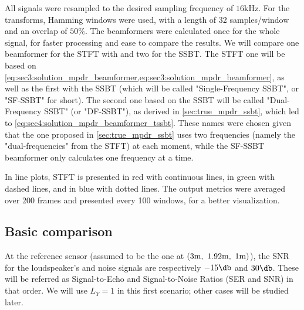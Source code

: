 All signals were resampled to the desired sampling frequency of $16\si{\kilo\hertz}$. For the transforms, Hamming windows were used, with a length of 32 samples/window and an overlap of $50\%$. The beamformers were calculated once for the whole signal, for faster processing and ease to compare the results. We will compare one beamformer for the STFT with and two for the SSBT. The STFT one will be based on \cref{eq:sec3:solution_mpdr_beamformer,eq:sec3:solution_mpdr_beamformer}, as well as the first with the SSBT (which will be called "Single-Frequency SSBT", or "SF-SSBT" for short). The second one based on the SSBT will be called "Dual-Frequency SSBT" (or "DF-SSBT"), as derived in \cref{sec:true_mpdr_ssbt}, which led to \cref{eq:sec4:solution_mpdr_beamformer_tssbt}. These names were chosen given that the one proposed in \cref{sec:true_mpdr_ssbt} uses two frequencies (namely the "dual-frequencies" from the STFT) at each moment, while the SF-SSBT beamformer only calculates one frequency at a time.

In line plots, STFT is presented in red with continuous lines, \nssbt{} in green with dashed lines, and \tssbt{} in blue with dotted lines. The output metrics were averaged over 200 frames and presented every 100 windows, for a better visualization.
%

\subsection{Basic comparison}
At the reference sensor (assumed to be the one at $(3\si{\meter},~1.92\si{\meter},~1\si{\meter})$), the SNR for the loudspeaker's and noise signals are respectively $-15\dB$ and $30\dB$. These will be referred as Signal-to-Echo and Signal-to-Noise Ratios (SER and SNR) in that order. We will use $L_Y = 1$ in this first scenario; other cases will be studied later.%

